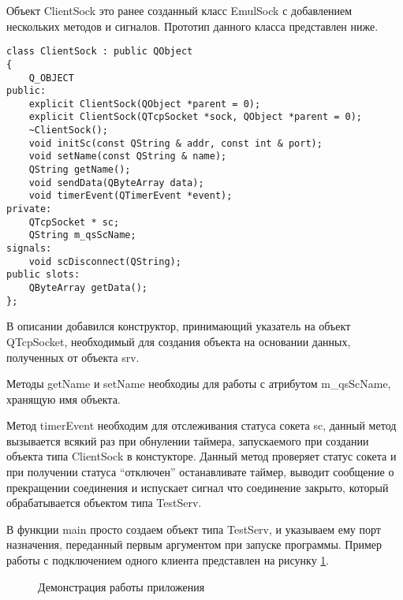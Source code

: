 Объект ClientSock это ранее созданный класс EmulSock с добавлением нескольких методов и сигналов. Прототип данного класса представлен ниже.

\begin{lstlisting}
class ClientSock : public QObject
{
    Q_OBJECT
public:
    explicit ClientSock(QObject *parent = 0);
    explicit ClientSock(QTcpSocket *sock, QObject *parent = 0);
    ~ClientSock();
    void initSc(const QString & addr, const int & port);
    void setName(const QString & name);
    QString getName();
    void sendData(QByteArray data);
    void timerEvent(QTimerEvent *event);
private:
    QTcpSocket * sc;
    QString m_qsScName;
signals:
    void scDisconnect(QString);
public slots:
    QByteArray getData();
};
\end{lstlisting}

В описании добавился конструктор, принимающий указатель на объект QTcpSocket, необходимый для создания объекта на основании данных, полученных от объекта srv.

Методы getName и setName необходиы для работы с атрибутом m\_qsScName, хранящую имя объекта.

Метод timerEvent необходим для отслеживания статуса сокета sc, данный метод вызывается всякий раз при обнулении таймера, запускаемого при создании объекта типа ClientSock в констукторе. Данный метод проверяет статус сокета и при получении статуса ``отключен'' останавливате таймер, выводит сообщение о прекращении соединения и испускает сигнал что соединение закрыто, который обрабатывается объектом типа TestServ.

В функции main просто создаем объект типа TestServ, и указываем ему порт назначения, переданный первым аргументом при запуске программы. Пример работы с подключением одного клиента представлен на рисунку \ref{clientEmul:clientEmul}.

\begin{figure}[h!]
 \caption{Демонстрация работы приложения}
 \label{clientEmul:clientEmul}
\end{figure}
